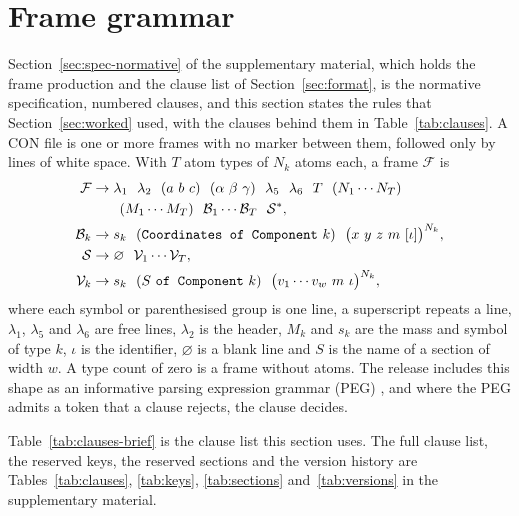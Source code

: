 \section{Frame grammar}\label{sec:supp-grammar}
Section~\ref*{sec:spec-normative} of the supplementary material, which holds the frame production and the clause list of Section~\ref{sec:format}, is the
normative specification, \clauseTotal{} numbered clauses, and this
section states the rules that Section~\ref{sec:worked} used, with the
clauses behind them in Table~\ref{tab:clauses}.
A CON file is one or more frames with no marker between them, followed
only by lines of white space.
With \(T\) atom types of \(N_k\) atoms each, a frame \(\mathcal{F}\) is
\begin{equation}
\label{eq:frame}
\begin{aligned}
\mathcal{F}&\to \lambda_1\ \ \lambda_2\ \ (a\ b\ c)\ \ (\alpha\ \beta\ \gamma)\ \ \lambda_5\ \ \lambda_6\ \ T\ \ (N_1\cdots N_T)\\
&\qquad (M_1\cdots M_T)\ \ \mathcal{B}_1\cdots\mathcal{B}_T\ \ \mathcal{S}^{*},\\
\mathcal{B}_k&\to s_k\ \ (\text{\texttt{Coordinates of Component}}\ k)\ \ \bigl(x\ y\ z\ m\ [\iota]\bigr)^{N_k},\\
\mathcal{S}&\to \varnothing\ \ \mathcal{V}_1\cdots\mathcal{V}_T,\\
\mathcal{V}_k&\to s_k\ \ (S\ \text{\texttt{of Component}}\ k)\ \ \bigl(v_1\cdots v_w\ m\ \iota\bigr)^{N_k},
\end{aligned}
\end{equation}
where each symbol or parenthesised group is one line, a superscript
repeats a line, \(\lambda_1\), \(\lambda_5\) and \(\lambda_6\) are free
lines, \(\lambda_2\) is the header, \(M_k\) and \(s_k\) are the mass and
symbol of type \(k\), \(\iota\) is the identifier, \(\varnothing\) is a
blank line and \(S\) is the name of a section of width \(w\).
A type count of zero is a frame without atoms.
The release includes this shape as an informative parsing expression
grammar (PEG) \cite{fordParsingExpressionGrammars2004}, and where the
PEG admits a token that a clause rejects, the clause decides.

Table~\ref{tab:clauses-brief} is the clause list this section uses.
The full clause list, the reserved keys, the reserved sections and the version history are Tables~\ref{tab:clauses}, \ref{tab:keys}, \ref{tab:sections} and~\ref{tab:versions} in the supplementary material.

